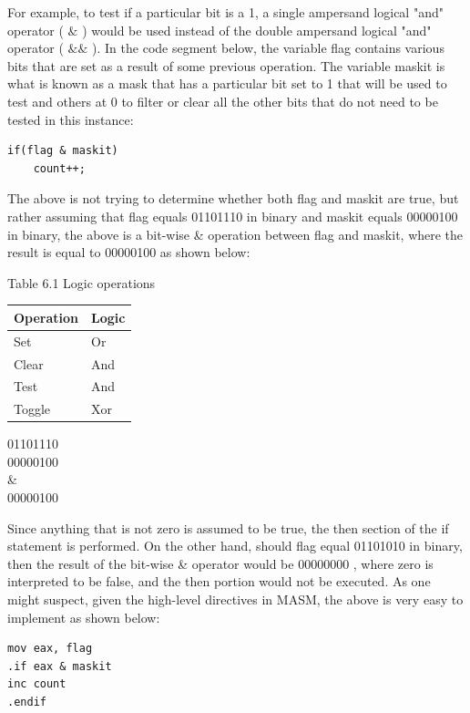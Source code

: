 \documentclass[10pt]{book}
\begin{document}
For example, to test if a particular bit is a 1, a single ampersand logical "and" operator ( $\&$ ) would be used instead of the double ampersand logical "and" operator ( $\& \&$ ). In the code segment below, the variable flag contains various bits that are set as a result of some previous operation. The variable maskit is what is known as a mask that has a particular bit set to 1 that will be used to test and others at 0 to filter or clear all the other bits that do not need to be tested in this instance:

\begin{verbatim}
if(flag & maskit)
    count++;
\end{verbatim}

The above is not trying to determine whether both flag and maskit are true, but rather assuming that flag equals 01101110 in binary and maskit equals 00000100 in binary, the above is a bit-wise \& operation between flag and maskit, where the result is equal to 00000100 as shown below:

Table 6.1 Logic operations

\begin{center}
\begin{tabular}{|ll|}
\hline
Operation & Logic \\
\hline
Set & Or \\
Clear & And \\
Test & And \\
Toggle & Xor \\
\hline
\end{tabular}
\end{center}

01101110\\
00000100\\
\&\\
00000100

Since anything that is not zero is assumed to be true, the then section of the if statement is performed. On the other hand, should flag equal 01101010 in binary, then the result of the bit-wise \& operator would be 00000000 , where zero is interpreted to be false, and the then portion would not be executed. As one might suspect, given the high-level directives in MASM, the above is very easy to implement as shown below:


\begin{verbatim}
mov eax, flag
.if eax & maskit
inc count
.endif
\end{verbatim}
\end{document}
